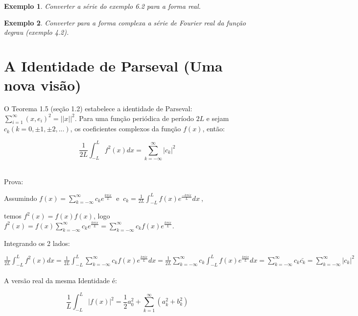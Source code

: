 \documentclass[a4paper,portuguese,9pt,final]{extarticle}
\newtheorem{example}{Exemplo}[section]
\begin{document}
\begin{multicols*}{2}
            \begin{example}	
                Converter a série do exemplo 6.2 para a forma real.
            \end{example}

            \begin{example}	
                Converter para a forma complexa a série de Fourier real da função degrau (exemplo 4.2).
            \end{example}

    \section{A Identidade de Parseval (Uma nova visão)}


        O Teorema 1.5 (seção 1.2) estabelece a identidade de Parseval: $ \displaystyle \sum_{i=1}^{\infty} (x,e_{i})^{2} = ||x||^{2} $. Para uma função periódica de período $ 2L $ e sejam $ c_{k} (k=0,\pm1, \pm2, ...) $, os coeficientes complexos da função $f(x)$, então:

        $$ \frac{1}{2L} \int_{-L}^{L} f^{2}(x)dx = \sum_{k=-\infty}^{\infty} |c_{k}|^{2}  $$ \

        Prova:

        Assumindo $\displaystyle f(x)= \sum_{k=-\infty}^{\infty} c_{k} e^{\frac{k\pi ix}{L}}\ $ e  $\ \displaystyle c_{k}=\frac{1}{2L}\int_{-L}^{L} f(x)e^{\frac{-k\pi ix}{L}} dx\ $, 

        temos $ f^{2}(x)=f(x)f(x) $, logo $\displaystyle f^{2}(x)=f(x) \sum_{k=-\infty}^{\infty} c_{k} e^{\frac{k\pi ix}{L}} = \sum_{k=-\infty}^{\infty} c_{k} f(x) e^{\frac{k\pi ix}{L}} $.

        \vspace{1cm}
        Integrando os 2 lados:
        \vspace{0.3cm}

        $\displaystyle \frac{1}{2L}\int_{-L}^{L} f^{2}(x)dx = \frac{1}{2L}\int_{-L}^{L}\sum_{k=-\infty}^{\infty} c_{k} f(x) e^{\frac{k\pi ix}{L}}dx = \frac{1}{2L} \sum_{k=-\infty}^{\infty} c_{k} \int_{-L}^{L} f(x) e^{\frac{k\pi ix}{L}}dx = \sum_{k=-\infty}^{\infty} c_{k}\bar{c_{k}} = \sum_{k=-\infty}^{\infty} |c_{k}|^{2} $ \\ \\

        A versão real da mesma Identidade é:


        $$ \frac{1}{L}\int_{-L}^{L} |f(x)|^{2} = \frac{1}{2} a_{0}^{2}  + \sum_{k=1}^{\infty} (a_{k}^{2} + b_{k}^{2}) $$ \


\end{multicols*}
\end{document}
